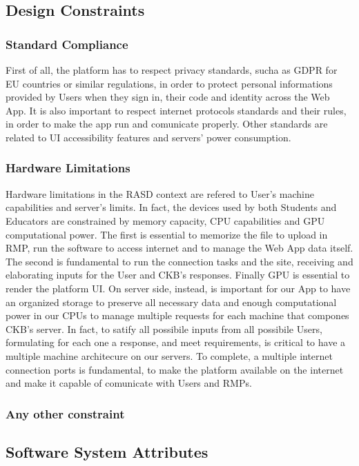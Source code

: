 \subsection{Design Constraints}

\subsubsection{Standard Compliance}
First of all, the platform has to respect privacy standards, sucha as GDPR for EU countries or similar regulations, in order to protect personal informations provided by Users when they sign in, their code and identity across the Web App. It is also important to respect internet protocols standards and their rules, in order to make the app run and comunicate properly. Other standards are related to UI accessibility features and servers' power consumption. 
\subsubsection{Hardware Limitations}
Hardware limitations in the RASD context are refered to User's machine capabilities and server's limits. In fact, the devices used by both Students and Educators are constrained by memory capacity, CPU capabilities and GPU computational power. The first is essential to memorize the file to upload in RMP, run the software to access internet and to manage the Web App data itself. The second is fundamental to run the connection tasks and the site, receiving and elaborating inputs for the User and CKB's responses. Finally GPU is essential to render the platform UI. On server side, instead, is important for our App to have an organized storage to preserve all necessary data and enough computational power in our CPUs to manage multiple requests for each machine that compones CKB's server. In fact, to satify all possibile inputs from all possibile Users, formulating for each one a response, and meet requirements, is critical to have a multiple machine architecure on our servers. To complete, a multiple internet connection ports is fundamental, to make the platform available on the internet and make it capable of comunicate with Users and RMPs.
\subsubsection{Any other constraint}

\subsection{Software System Attributes}

